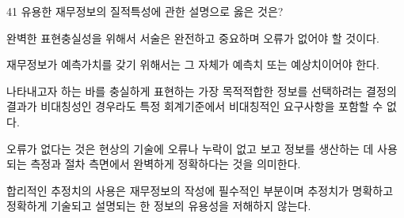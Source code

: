 \begin{question}{41}
유용한 재무정보의 질적특성에 관한 설명으로 옳은 것은?
\begin{choices}
  \item 완벽한 표현충실성을 위해서 서술은 완전하고 중요하며 오류가 없어야 할 것이다.
  \item 재무정보가 예측가치를 갖기 위해서는 그 자체가 예측치 또는 예상치이어야 한다.
  \item 나타내고자 하는 바를 충실하게 표현하는 가장 목적적합한 정보를 선택하려는 결정의 결과가 비대칭성인 경우라도 특정 회계기준에서 비대칭적인 요구사항을 포함할 수 없다.
  \item 오류가 없다는 것은 현상의 기술에 오류나 누락이 없고 보고 정보를 생산하는 데 사용되는 측정과 절차 측면에서 완벽하게 정확하다는 것을 의미한다.
  \item 합리적인 추정치의 사용은 재무정보의 작성에 필수적인 부분이며 추정치가 명확하고 정확하게 기술되고 설명되는 한 정보의 유용성을 저해하지 않는다.
\end{choices}
\end{question}
